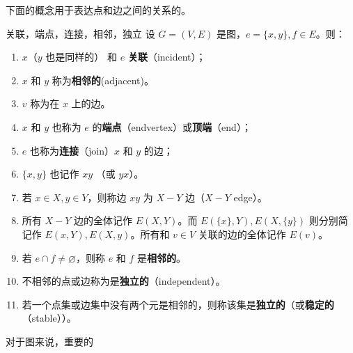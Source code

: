 下面的概念用于表达点和边之间的关系的。
\begin{definition}{关联，端点，连接，相邻，独立}
设 $G=(V,E)$ 是图，$e=\{x,y\},f\in E$。则：

 \begin{enumerate}
 \item $x$（$y$ 也是同样的） 和 $e$ \textbf{关联}（incident）；

   \item  $x$ 和 $y$ 称为\textbf{相邻的}(adjacent)。

   \item $v$ 称为在 $x$ 上的边。
  
   \item $x$ 和 $y$ 也称为 $e$ 的\textbf{端点}（endvertex）或\textbf{顶端}（end）；
  
  \item  $e$ 也称为\textbf{连接}（join）$x$ 和 $y$ 的边；

  \item  $\{x,y\}$ 也记作 $xy$ （或 $yx$）。
  
   \item 若 $x\in X,y\in Y$，则称边 $xy$ 为 $X-Y$ 边（$X-Y$ edge）。
  
   \item 所有 $X-Y$ 边的全体记作 $E(X,Y)$。而 $E(\{x\},Y),E(X,\{y\})$ 则分别简记作 $E(x,Y),E(X,y)$。所有和 $v\in V$ 关联的边的全体记作 $E(v)$。

   \item 若 $e\cap f\neq\varnothing$，则称 $e$ 和 $f$ 是\textbf{相邻的}。

   \item 不相邻的点或边称为是\textbf{独立的}（independent）。
   
   \item 若一个点集或边集中没有两个元是相邻的，则称该集是\textbf{独立的}（或\textbf{稳定的}（stable））。
 \end{enumerate}
\end{definition}

对于图来说，重要的




